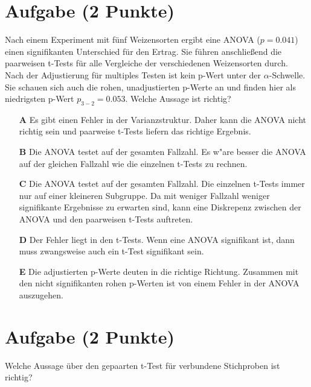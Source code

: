 \documentclass[a4paper, 10pt]{scrartcl}\usepackage[]{graphicx}\usepackage[]{xcolor}
\begin{document}
\section{Aufgabe \hfill (2 Punkte)}

Nach einem Experiment mit f{\"u}nf Weizensorten ergibt eine ANOVA ($p = 0.041$)
einen signifikanten Unterschied f{\"u}r den Ertrag. Sie f{\"u}hren anschlie{\ss}end die
paarweisen t-Tests f{\"u}r alle Vergleiche der verschiedenen Weizensorten
durch. Nach der Adjustierung f{\"u}r multiples Testen ist kein p-Wert unter der
$\alpha$-Schwelle. Sie schauen sich auch die rohen, unadjustierten p-Werte
an und finden hier als niedrigsten p-Wert $p_{3-2} = 0.053$. Welche Aussage
ist richtig? 



\begin{enumerate}
\item [\textbf{A} \msquare] Es gibt einen Fehler in der Varianzstruktur. Daher kann die ANOVA nicht richtig sein und paarweise t-Tests liefern das richtige Ergebnis.
\item [\textbf{B} \msquare] Die ANOVA testet auf der gesamten Fallzahl. Es w{"a}re besser die ANOVA auf der gleichen Fallzahl wie die einzelnen t-Tests zu rechnen.
\item [\textbf{C} \msquare] Die ANOVA testet auf der gesamten Fallzahl. Die einzelnen t-Tests immer nur auf einer kleineren Subgruppe. Da mit weniger Fallzahl weniger signifikante Ergebnisse zu erwarten sind, kann eine Diskrepenz zwischen der ANOVA und den paarweisen t-Tests auftreten.
\item [\textbf{D} \msquare] Der Fehler liegt in den t-Tests. Wenn eine ANOVA signifikant ist, dann muss zwangsweise auch ein t-Test signifikant sein.
\item [\textbf{E} \msquare] Die adjustierten p-Werte deuten in die richtige Richtung. Zusammen mit den nicht signifikanten rohen p-Werten ist von einem Fehler in der ANOVA auszugehen.
\end{enumerate}

\section{Aufgabe \hfill (2 Punkte)}

Welche Aussage {\"u}ber den gepaarten t-Test f{\"u}r verbundene Stichproben ist richtig?
\end{document}
